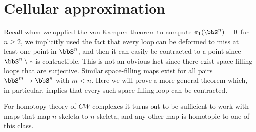 \section{Cellular approximation}


Recall when we applied the van Kampen theorem to compute $\pi_1(\bbS^n)=0$ for $n\geq 2$, we implicitly used the fact that every loop can be deformed to miss at least one point in $\bbS^n$, and then it can easily be contracted to a point since $\bbS^n\setminus *$ is contractible. This is not an obvious fact since there exist space-filling loops that are surjective. Similar space-filling maps exist for all pairs $\bbS^m\to \bbS^n$ with $m<n$. Here we will prove a more general theorem which, in particular, implies that every such space-filling loop can be contracted.

For homotopy theory of $CW$ complexes it turns out to be sufficient to work with maps that map $n$-skeleta to $n$-skeleta, and any other map is homotopic to one of this class.



